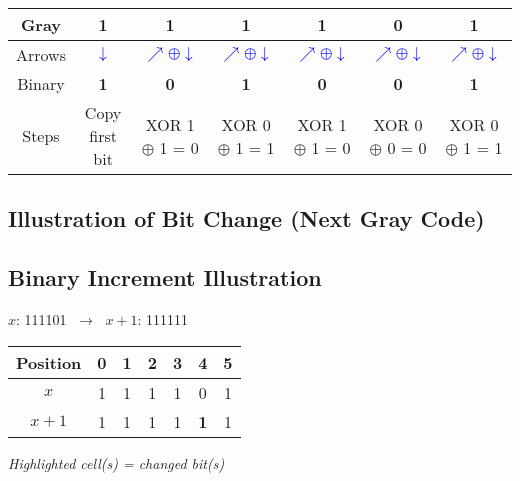  \begin{center}
\renewcommand{\arraystretch}{1.3}
\begin{tabular}{|c|*6{c|}}
  \hline
    Gray &
    1 &    1 &    1 &    1 &    0 &    1  \\
  \hline

  Arrows &
      \textcolor{blue}{$\downarrow$} &
        \textcolor{blue}{$\nearrow \oplus \downarrow$} &        \textcolor{blue}{$\nearrow \oplus \downarrow$} &        \textcolor{blue}{$\nearrow \oplus \downarrow$} &        \textcolor{blue}{$\nearrow \oplus \downarrow$} &        \textcolor{blue}{$\nearrow \oplus \downarrow$}  \\
  \hline

    Binary &
    \textbf{ 1 } &    \textbf{ 0 } &    \textbf{ 1 } &    \textbf{ 0 } &    \textbf{ 0 } &    \textbf{ 1 }  \\
  \hline

  Steps &
    {\scriptsize Copy first bit } &    {\scriptsize XOR 1 $\oplus$ 1 = 0 } &    {\scriptsize XOR 0 $\oplus$ 1 = 1 } &    {\scriptsize XOR 1 $\oplus$ 1 = 0 } &    {\scriptsize XOR 0 $\oplus$ 0 = 0 } &    {\scriptsize XOR 0 $\oplus$ 1 = 1 }  \\
  \hline
\end{tabular}
\end{center}


\bigskip

\subsection*{Illustration of Bit Change (Next Gray Code)}
\subsection*{Binary Increment Illustration}

$x$: 111101 $\;\to\;$ $x+1$: 111111

\begin{tabular}{|c|*6{c|}}
\hline
Position &  0 &  1 &  2 &  3 &  4 &  5   \\
\hline
$x$ &  1 &  1 &  1 &  1 &  0 &  1   \\
\hline
$x+1$ &     1
&    1
&    1
&    1
&    \cellcolor{yellow}\textbf{ 1 }
&    1
 \\
\hline
\end{tabular}

\emph{Highlighted cell(s) = changed bit(s)}


\bigskip

